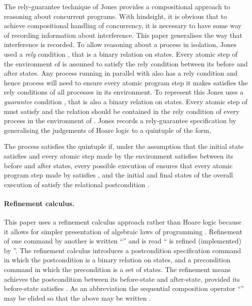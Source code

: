 \documentclass[fleqn]{fac}
\begin{document}
The rely-guarantee technique of Jones \cite{Jones81d,jon83a,jones96a}
provides a compositional approach to reasoning about concurrent programs.
With hindsight, it is obvious that to achieve compositional handling of concurrency, 
it is necessary to have some way of recording information about interference.
This paper generalises the way that interference is recorded.
To allow reasoning about a process  in isolation,
Jones used a \emph{rely} condition ,
that is a binary relation on states.
Every atomic step of the environment of  is assumed to satisfy the rely condition 
between its before and after states.
Any process running in parallel with  also has a rely condition 
and hence process  will need to ensure every atomic program step it makes satisfies 
the rely conditions of all processes in its environment.
To represent this Jones uses a \emph{guarantee} condition ,
that is also a binary relation on states.
Every atomic step of  must satisfy 
and the relation  should be contained in the rely condition of every process
in the environment of .
Jones records a rely-guarantee specification by generalising the judgements of 
Hoare logic \cite{Hoare69a} to a quintuple of the form,

The process  satisfies the quintuple if, 
under the assumption that
the initial state satisfies  and 
every atomic step made by the environment satisfies  between its before and after states,
every possible execution of  
ensures that every atomic program step made by  satisfies , 
and the initial and final states of the overall execution of 
satisfy the relational postcondition .

\paragraph{Refinement calculus.}

This paper uses a refinement calculus approach \cite{Bac81a,BackWright98,TSS,Morgan94,ATBfSRatPC}
rather than Hoare logic because it allows for simpler presentation of algebraic laws of programming \cite{HoareHayesEtcFull87}.
Refinement of one command  by another  is written ``'' and 
is read `` is refined (implemented) by ''.
The refinement calculus introduces 
a postcondition specification command  in which the postcondition  is a binary relation on states,
and a precondition command  in which the precondition  is a set of states.
The refinement  means  achieves the postcondition  between
its before-state and after-state, provided its before-state satisfies .
As an abbreviation the sequential composition operator ``'' may be elided 
so that the above may be written .
\end{document}
